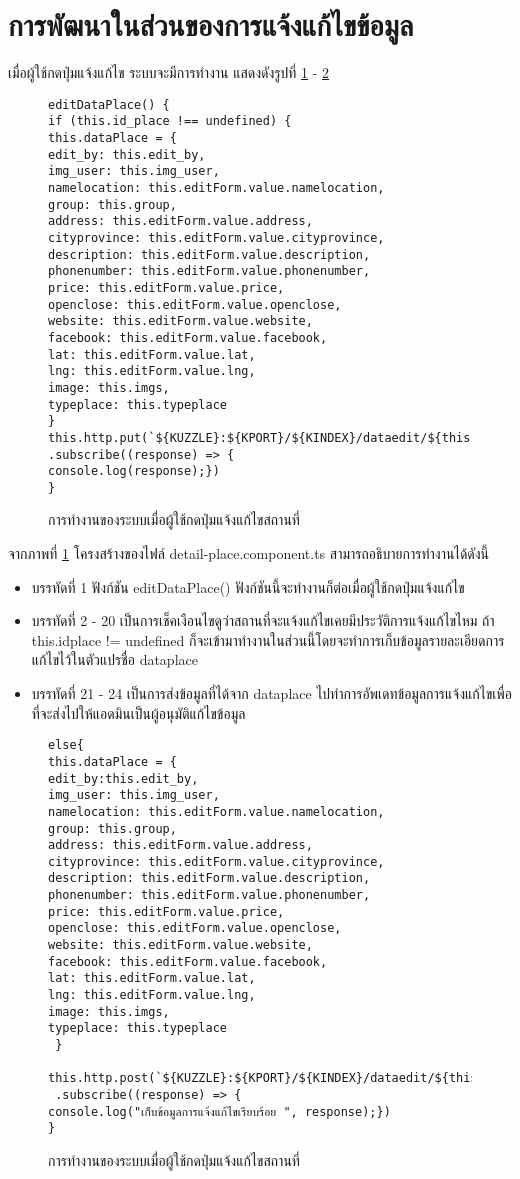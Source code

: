 \section{การพัฒนาในส่วนของการแจ้งแก้ไขข้อมูล}
เมื่อผู้ใช้กดปุ่มแจ้งแก้ไข ระบบจะมีการทำงาน แสดงดังรูปที่ \ref{Fig:4-edit} - \ref{Fig:4-edit1}
\begin{figure}[H]
{\lstset{language=Pascal}
\begin{lstlisting}
editDataPlace() {
if (this.id_place !== undefined) {
this.dataPlace = {
edit_by: this.edit_by,
img_user: this.img_user,
namelocation: this.editForm.value.namelocation,
group: this.group,
address: this.editForm.value.address,
cityprovince: this.editForm.value.cityprovince,
description: this.editForm.value.description,
phonenumber: this.editForm.value.phonenumber,
price: this.editForm.value.price,
openclose: this.editForm.value.openclose,
website: this.editForm.value.website,
facebook: this.editForm.value.facebook,
lat: this.editForm.value.lat,
lng: this.editForm.value.lng,
image: this.imgs,
typeplace: this.typeplace
}
this.http.put(`${KUZZLE}:${KPORT}/${KINDEX}/dataedit/${this._id}/_update`,this.dataPlace)
.subscribe((response) => {
console.log(response);})
}
\end{lstlisting}}
\caption{การทำงานของระบบเมื่อผู้ใช้กดปุ่มแจ้งแก้ไขสถานที่}
\label{Fig:4-edit}
\end{figure}
จากภาพที่ \ref{Fig:4-edit} โครงสร้างของไฟล์ detail-place.component.ts สามารถอธิบายการทำงานได้ดังนี้
\begin{itemize}[label={--}]
\item บรรทัดที่ 1 ฟังก์ชัน editDataPlace() ฟังก์ชันนี้จะทำงานก็ต่อเมื่อผู้ใช้กดปุ่มแจ้งแก้ไข
\item บรรทัดที่ 2 - 20 เป็นการเช็คเงือนไขดูว่าสถานที่จะแจ้งแก้ไขเคยมีประวัติการแจ้งแก้ไขไหม ถ้า this.idplace != undefined ก็จะเข้ามาทำงานในส่วนนี้โดยจะทำการเก็บข้อมูลรายละเอียดการแก้ไขไว้ในตัวแปรชื่อ dataplace
\item บรรทัดที่ 21 - 24 เป็นการส่งข้อมูลที่ได้จาก dataplace ไปทำการอัพเดทข้อมูลการแจ้งแก้ไขเพื่อที่จะส่งไปให้แอดมินเป็นผู้อนุมัติแก้ไขข้อมูล
\end{itemize}


\begin{figure}[H]
{\lstset{language=Pascal}
\begin{lstlisting}
else{
this.dataPlace = {
edit_by:this.edit_by,
img_user: this.img_user,
namelocation: this.editForm.value.namelocation,
group: this.group,
address: this.editForm.value.address,
cityprovince: this.editForm.value.cityprovince,
description: this.editForm.value.description,
phonenumber: this.editForm.value.phonenumber,
price: this.editForm.value.price,
openclose: this.editForm.value.openclose,
website: this.editForm.value.website,
facebook: this.editForm.value.facebook,
lat: this.editForm.value.lat,
lng: this.editForm.value.lng,
image: this.imgs,
typeplace: this.typeplace
 }
 this.http.post(`${KUZZLE}:${KPORT}/${KINDEX}/dataedit/${this._id}/_create`,this.dataPlace)
 .subscribe((response) => {
console.log("เก็บข้อมูลการแจ้งแก้ไขเรียบร้อย ", response);})
}
\end{lstlisting}}
\caption{การทำงานของระบบเมื่อผู้ใช้กดปุ่มแจ้งแก้ไขสถานที่}
\label{Fig:4-edit1}
\end{figure}

